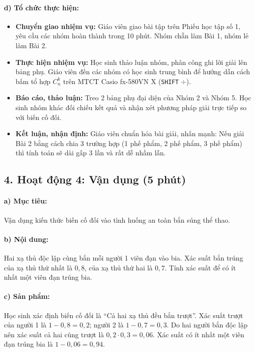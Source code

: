\documentclass[12pt, a4paper]{article}
\begin{document}
\paragraph{d) Tổ chức thực hiện:}
\begin{itemize}[leftmargin=0.8cm]
    \item \textbf{Chuyển giao nhiệm vụ:} Giáo viên giao bài tập trên Phiếu học tập số 1, yêu cầu các nhóm hoàn thành trong 10 phút. Nhóm chẵn làm Bài 1, nhóm lẻ làm Bài 2.
    \item \textbf{Thực hiện nhiệm vụ:} Học sinh thảo luận nhóm, phân công ghi lời giải lên bảng phụ. Giáo viên đến các nhóm có học sinh trung bình để hướng dẫn cách bấm tổ hợp $C_n^k$ trên MTCT Casio fx-580VN X (\texttt{SHIFT} $\div$).
    \item \textbf{Báo cáo, thảo luận:} Treo 2 bảng phụ đại diện của Nhóm 2 và Nhóm 5. Học sinh nhóm khác đối chiếu kết quả và nhận xét phương pháp giải trực tiếp so với biến cố đối.
    \item \textbf{Kết luận, nhận định:} Giáo viên chuẩn hóa bài giải, nhấn mạnh: Nếu giải Bài 2 bằng cách chia 3 trường hợp (1 phế phẩm, 2 phế phẩm, 3 phế phẩm) thì tính toán sẽ dài gấp 3 lần và rất dễ nhầm lẫn.
\end{itemize}

\subsection*{4. Hoạt động 4: Vận dụng (5 phút)}

\paragraph{a) Mục tiêu:} Vận dụng kiến thức biến cố đối vào tình huống an toàn bắn súng thể thao.

\paragraph{b) Nội dung:} Hai xạ thủ độc lập cùng bắn mỗi người 1 viên đạn vào bia. Xác suất bắn trúng của xạ thủ thứ nhất là $0{,}8$, của xạ thủ thứ hai là $0{,}7$. Tính xác suất để có ít nhất một viên đạn trúng bia.

\paragraph{c) Sản phẩm:} Học sinh xác định biến cố đối là ``Cả hai xạ thủ đều bắn trượt''. Xác suất trượt của người 1 là $1 - 0{,}8 = 0{,}2$; người 2 là $1 - 0{,}7 = 0{,}3$. Do hai người bắn độc lập nên xác suất cả hai cùng trượt là $0{,}2 \cdot 0{,}3 = 0{,}06$. Xác suất có ít nhất một viên đạn trúng bia là $1 - 0{,}06 = 0{,}94$.
\end{document}
